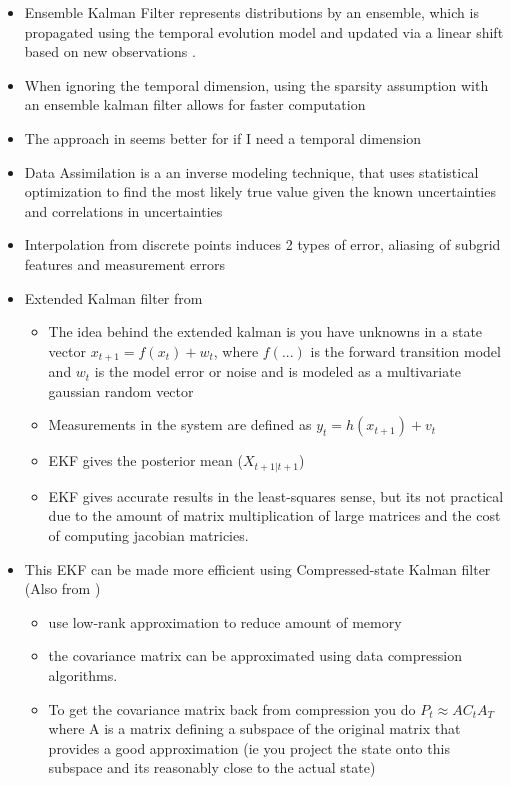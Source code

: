 \begin{itemize}
      \color{blue}
      \item Ensemble Kalman Filter represents distributions by an ensemble, which is propagated using the temporal evolution model and updated via a linear shift based on new observations \parencite{Jurek2021}.
      \item When ignoring the temporal dimension, using the sparsity assumption with an ensemble kalman filter allows for faster computation \parencite{Jurek2021}
      \item The approach in \citeauthor{Jurek2021} seems better for if I need a temporal dimension
      \item Data Assimilation is a an inverse modeling technique, that uses statistical optimization to find the most likely true value given the known uncertainties and correlations in uncertainties \parencite{Salim2021}
      \item Interpolation from discrete points induces 2 types of error, aliasing of subgrid features and measurement errors \parencite{Plant2002}

      \item  Extended Kalman filter from \parencite{Ghorbanidehno2019}
            \begin{itemize}
                  \item The idea behind the extended kalman is you have unknowns in a state vector $x_{t+1} = f(x_t) + w_t$, where $f(...)$ is the forward transition model and $w_t$ is the model error or noise and is modeled as a multivariate gaussian random vector
                  \item Measurements in the system are defined as $y_t = h(x_{t+1}) + v_t$
                  \item EKF gives the posterior mean ($X_{t+1 | t+1}$)
                  \item EKF gives accurate results in the least-squares sense, but its not practical due to the amount of matrix multiplication of large matrices and the cost of computing jacobian matricies.
            \end{itemize}
      \item This EKF can be made more efficient using Compressed-state Kalman filter (Also from \parencite{Ghorbanidehno2019})
            \begin{itemize}
                  \item use low-rank approximation to reduce amount of memory
                  \item the covariance matrix can be approximated using data compression algorithms.
                  \item To get the covariance matrix back from compression you do $P_t \approx A C_t A_T$ where A is a matrix defining a subspace of the original matrix that provides a good approximation (ie you project the state onto this subspace and its reasonably close to the actual state)


\end{itemize}
\end{itemize}
